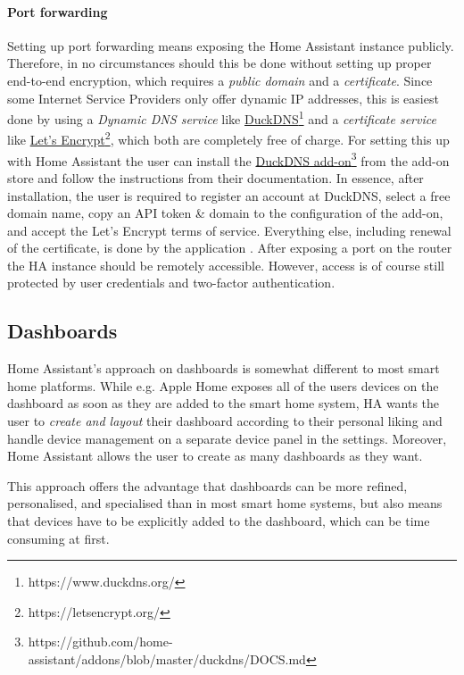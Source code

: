 \paragraph{Port forwarding}
Setting up port forwarding means exposing the Home Assistant instance publicly. Therefore, in no circumstances should this be done without setting up proper end-to-end encryption, which requires a \textit{public domain} and a \textit{certificate}. Since some Internet Service Providers only offer dynamic IP addresses, this is easiest done by using a \textit{Dynamic DNS service} \cite{HomeAssistant_Remote_Access} like \href{https://www.duckdns.org/}{DuckDNS}\footnote{https://www.duckdns.org/} and a \textit{certificate service} like \href{https://letsencrypt.org/}{Let's Encrypt}\footnote{https://letsencrypt.org/}, which both are completely free of charge. For setting this up with Home Assistant the user can install the \href{https://github.com/home-assistant/addons/blob/master/duckdns/DOCS.md}{DuckDNS add-on}\footnote{https://github.com/home-assistant/addons/blob/master/duckdns/DOCS.md} from the add-on store and follow the instructions from their documentation. In essence, after installation, the user is required to register an account at DuckDNS, select a free domain name, copy an API token \& domain to the configuration of the add-on, and accept the Let's Encrypt terms of service. Everything else, including renewal of the certificate, is done by the application \cite{HomeAssistant_DuckDNS_github}. After exposing a port on the router the HA instance should be remotely accessible. However, access is of course still protected by user credentials and two-factor authentication. 

\subsection{Dashboards}
Home Assistant's approach on dashboards is somewhat different to most smart home platforms. While e.g. Apple Home exposes all of the users devices on the dashboard as soon as they are added to the smart home system, HA wants the user to \textit{create and layout} their dashboard according to their personal liking and handle device management on a separate device panel in the settings. Moreover, Home Assistant allows the user to create as many dashboards as they want.

This approach offers the advantage that dashboards can be more refined, personalised, and specialised than in most smart home systems, but also means that devices have to be explicitly added to the dashboard, which can be time consuming at first. 

